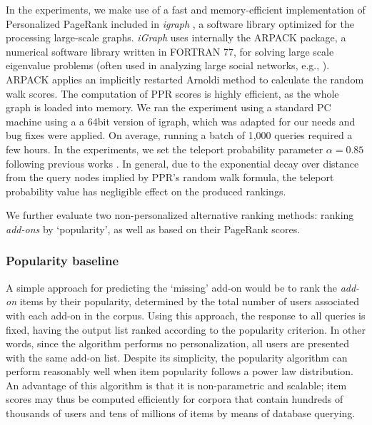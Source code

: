 \documentclass[11pt,oneside]{book}
\let\Oldsubsubsection\subsubsection
\renewcommand{\subsubsection}{\FloatBarrier\Oldsubsubsection}
\begin{document}
In the experiments, we make use of a fast and memory-efficient implementation of Personalized PageRank included in {\it igraph} \citep{igraph}, a software library optimized for the processing large-scale graphs. {\it iGraph} uses internally the ARPACK package, a numerical software library written in FORTRAN 77, for solving large scale eigenvalue problems (often used in analyzing large social networks, e.g., \citep{ting2004minig}). ARPACK applies an implicitly restarted Arnoldi method to calculate the random walk scores. The computation of PPR scores is highly efficient, as the whole graph is loaded into memory. We ran the experiment using a standard PC machine using a a 64bit version of igraph, which was adapted for our needs and bug fixes were applied. On average, running a batch of 1,000 queries required a few hours. In the experiments, we set the teleport probability parameter $\alpha=0.85$ following previous works \citep{boldi2005totalrank}. In general, due to the exponential decay over distance from the query nodes implied by PPR's random walk formula, the teleport probability value has negligible effect on the produced rankings.

We further evaluate two non-personalized alternative ranking methods: ranking {\it add-ons} by `popularity', as well as based on their PageRank scores. 

\subsubsection{Popularity baseline} 

A simple approach for predicting the `missing' add-on would be to rank the {\it add-on} items by their popularity, determined by the total number of users associated with each add-on in the corpus. Using this approach, the response to all queries is fixed, having the output list ranked according to the popularity criterion. In other words, since the algorithm performs no personalization, all users are presented with the same
add-on list. Despite its simplicity, the popularity algorithm can perform reasonably well when item popularity follows a power law distribution. An advantage of this algorithm is that it is non-parametric and scalable; item scores may thus be computed efficiently for corpora that contain hundreds of thousands of users and tens of millions of items by means of database querying. 
\end{document}
